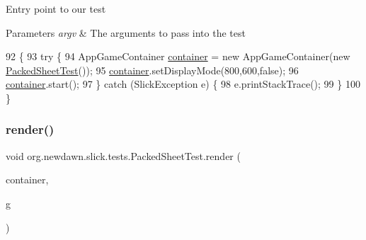 Entry point to our test


\begin{DoxyParams}{Parameters}
{\em argv} & The arguments to pass into the test \\
\hline
\end{DoxyParams}

\begin{DoxyCode}
92                                            \{
93         \textcolor{keywordflow}{try} \{
94             AppGameContainer \mbox{\hyperlink{classorg_1_1newdawn_1_1slick_1_1tests_1_1_packed_sheet_test_a627ba2a3381f2182796b91ede952fa0e}{container}} = \textcolor{keyword}{new} AppGameContainer(\textcolor{keyword}{new} 
      \mbox{\hyperlink{classorg_1_1newdawn_1_1slick_1_1tests_1_1_packed_sheet_test_a86041b335949cf5c245c09409e40936d}{PackedSheetTest}}());
95             \mbox{\hyperlink{classorg_1_1newdawn_1_1slick_1_1tests_1_1_packed_sheet_test_a627ba2a3381f2182796b91ede952fa0e}{container}}.setDisplayMode(800,600,\textcolor{keyword}{false});
96             \mbox{\hyperlink{classorg_1_1newdawn_1_1slick_1_1tests_1_1_packed_sheet_test_a627ba2a3381f2182796b91ede952fa0e}{container}}.start();
97         \} \textcolor{keywordflow}{catch} (SlickException e) \{
98             e.printStackTrace();
99         \}
100     \}
\end{DoxyCode}
\mbox{\label{classorg_1_1newdawn_1_1slick_1_1tests_1_1_packed_sheet_test_a183ae61174b77526979ea217c47b3027}} 
\subsubsection{\texorpdfstring{render()}{render()}}
{\footnotesize\ttfamily void org.\+newdawn.\+slick.\+tests.\+Packed\+Sheet\+Test.\+render (\begin{DoxyParamCaption}\item[{\mbox{\hyperlink{classorg_1_1newdawn_1_1slick_1_1_game_container}{Game\+Container}}}]{container,  }\item[{\mbox{\hyperlink{classorg_1_1newdawn_1_1slick_1_1_graphics}{Graphics}}}]{g }\end{DoxyParamCaption})\hspace{0.3cm}{\ttfamily [inline]}}

